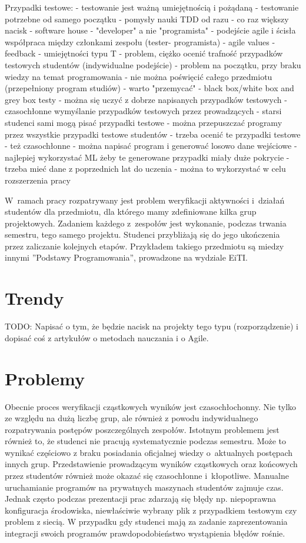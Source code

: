 Przypadki testowe:
	- testowanie jest ważną umiejętnością i pożądaną
	- testowanie potrzebne od samego początku
	- pomysły nauki TDD od razu
	- co raz większy nacisk
	- software house - "developer" a nie "programista"
	- podejście agile i ścisła współpraca między członkami zespołu (tester- programista)
	- agile values - feedback
	- umiejętności typu T
	- problem, ciężko ocenić trafność przypadków testowych studentów (indywidualne podejście)
	- problem na początku, przy braku wiedzy na temat programowania
	- nie można poświęcić całego przedmiotu (przepełniony program studiów)
	- warto "przemycać"
	- black box/white box and grey box testy
	- można się uczyć z dobrze napisanych przypadków testowych
	- czasochłonne wymyślanie przypadków testowych przez prowadzących
	- starsi studenci sami mogą pisać przypadki testowe
	- można przepuszczać programy przez wszystkie przypadki testowe studentów
	- trzeba ocenić te przypadki testowe - też czasochłonne
	- można napisać program i generować losowo dane wejściowe
	- najlepiej wykorzystać ML żeby te generowane przypadki miały duże pokrycie
	- trzeba mieć dane z poprzednich lat do uczenia
	- można to wykorzystać w celu rozszerzenia pracy




W~ramach pracy rozpatrywany jest problem weryfikacji aktywności i~działań studentów dla przedmiotu, dla którego mamy zdefiniowane kilka grup projektowych.
Zadaniem każdego z~zespołów jest wykonanie, podczas trwania semestru, tego samego projektu.
Studenci przybliżają się do jego ukończenia przez zaliczanie kolejnych etapów.
Przykładem takiego przedmiotu są miedzy innymi ”Podstawy Programowania”, prowadzone na wydziale EiTI.

\section{Trendy}

TODO:
Napisać o tym, że będzie nacisk na projekty tego typu (rozporządzenie) i dopisać coś z artykułów o metodach nauczania i o Agile.

\section {Problemy}

Obecnie proces weryfikacji cząstkowych wyników jest czasochłochonny.
Nie tylko ze względu na dużą liczbę grup, ale również z powodu indywidualnego rozpatrywania postępów poszczególnych zespołów.
Istotnym problemem jest również to, że studenci nie pracują systematycznie podczas semestru.
Może to wynikać częściowo z braku posiadania oficjalnej wiedzy o~aktualnych postępach innych grup.
Przedstawienie prowadzącym wyników cząstkowych oraz końcowych przez studentów również może okazać się czasochłonne i~kłopotliwe.
Manualne uruchamianie programów na prywatnych maszynach studentów zajmuje czas.
Jednak często podczas prezentacji prac zdarzają się błędy np. niepoprawna konfiguracja środowiska, niewłaściwie wybrany plik z przypadkiem testowym czy problem z siecią.
W przypadku gdy studenci mają za zadanie zaprezentowania integracji swoich programów prawdopodobieństwo wystąpienia błędów rośnie.

